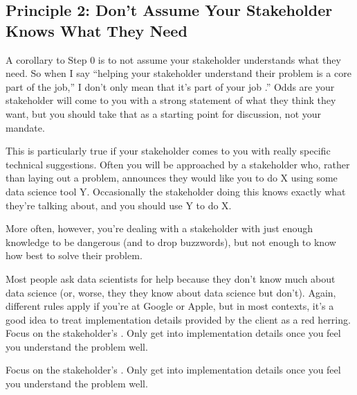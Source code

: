 \documentclass[letterpaper,10pt,english]{jupyterBook}
\begin{document}
\subsection{Principle 2: Don’t Assume Your Stakeholder Knows What They Need}
\label{\detokenize{20_problems_to_questions/20_stakeholder_management:principle-2-don-t-assume-your-stakeholder-knows-what-they-need}}
\sphinxAtStartPar
A corollary to Step 0 is to not assume your stakeholder understands what they need. So when I say “helping your stakeholder understand their problem is a core part of the job,” I don’t only mean that it’s part of your job .” Odds are your stakeholder will come to you with a strong statement of what they think they want, but you should take that as a starting point for discussion, not your mandate.

\sphinxAtStartPar
This is particularly true if your stakeholder comes to you with really specific technical suggestions. Often you will be approached by a stakeholder who, rather than laying out a problem, announces they would like you to do X using some data science tool Y. Occasionally the stakeholder doing this knows exactly what they’re talking about, and you should use Y to do X.

\sphinxAtStartPar
More often, however, you’re dealing with a stakeholder with just enough knowledge to be dangerous (and to drop buzzwords), but not enough to know how best to solve their problem.

\sphinxAtStartPar
Most people ask data scientists for help because they don’t know much about data science (or, worse, they  they know about data science but don’t). Again, different rules apply if you’re at Google or Apple, but in most contexts, it’s a good idea to treat implementation details provided by the client as a red herring. Focus on the stakeholder’s . Only get into implementation details once you feel you understand the problem well.

\begin{sphinxShadowBox}

\sphinxAtStartPar
Focus on the stakeholder’s . Only get into implementation details once you feel you understand the problem well.
\end{sphinxShadowBox}
\end{document}
